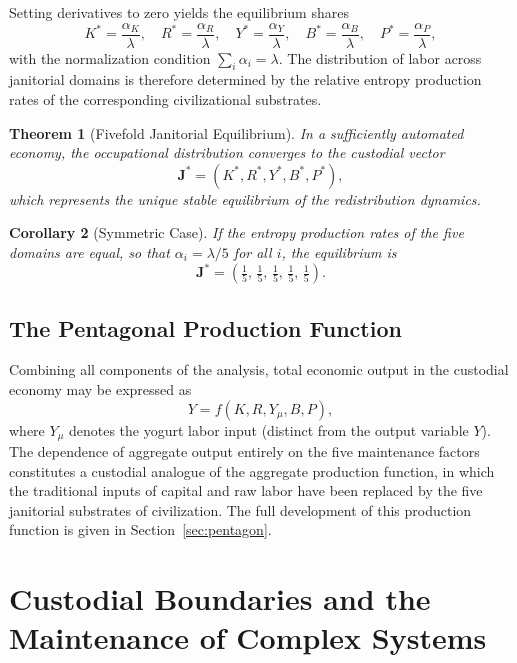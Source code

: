 \documentclass[12pt,a4paper]{article}
\theoremstyle{plain}
\newtheorem{theorem}{Theorem}[section]
\newtheorem{corollary}[theorem]{Corollary}
\theoremstyle{definition}
\theoremstyle{remark}
\begin{document}
Setting derivatives to zero yields the equilibrium shares
\[
K^* = \frac{\alpha_K}{\lambda}, \quad
R^* = \frac{\alpha_R}{\lambda}, \quad
Y^* = \frac{\alpha_Y}{\lambda}, \quad
B^* = \frac{\alpha_B}{\lambda}, \quad
P^* = \frac{\alpha_P}{\lambda},
\]
with the normalization condition $\sum_i \alpha_i = \lambda$.  The
distribution of labor across janitorial domains is therefore determined by
the relative entropy production rates of the corresponding civilizational
substrates.

\begin{theorem}[Fivefold Janitorial Equilibrium]\label{thm:fivefold}
In a sufficiently automated economy, the occupational distribution converges
to the custodial vector
\[
\mathbf{J}^* = (K^*, R^*, Y^*, B^*, P^*),
\]
which represents the unique stable equilibrium of the redistribution dynamics.
\end{theorem}

\begin{corollary}[Symmetric Case]\label{cor:symmetric}
If the entropy production rates of the five domains are equal, so that
$\alpha_i = \lambda/5$ for all $i$, the equilibrium is
\[
\mathbf{J}^* = \left(\tfrac{1}{5},\, \tfrac{1}{5},\, \tfrac{1}{5},\, \tfrac{1}{5},\, \tfrac{1}{5}\right).
\]
\end{corollary}

\subsection{The Pentagonal Production Function}

Combining all components of the analysis, total economic output in the
custodial economy may be expressed as
\[
Y = f(K, R, Y_\mu, B, P),
\]
where $Y_\mu$ denotes the yogurt labor input (distinct from the output
variable $Y$).  The dependence of aggregate output entirely on the five
maintenance factors constitutes a custodial analogue of the aggregate
production function, in which the traditional inputs of capital and raw
labor have been replaced by the five janitorial substrates of civilization.
The full development of this production function is given in
Section~\ref{sec:pentagon}.


\section{Custodial Boundaries and the Maintenance of Complex Systems}
\label{sec:boundaries}
\end{document}
